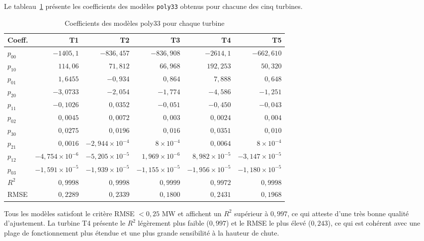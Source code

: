 \documentclass[12pt, letterpaper]{report}
\begin{document}
Le tableau~\ref{tab:coefficients} présente les coefficients des modèles \texttt{poly33} obtenus pour chacune des cinq turbines.

\begin{table}[H]
  \centering
  \caption{Coefficients des modèles poly33 pour chaque turbine}
  \label{tab:coefficients}
  \begin{tabular}{lrrrrr}
    \toprule
    Coeff. & T1 & T2 & T3 & T4 & T5 \\
    \midrule
    $p_{00}$ & $-1405{,}1$ & $-836{,}457$ & $-836{,}908$ & $-2614{,}1$ & $-662{,}610$ \\
    $p_{10}$ & $114{,}06$ & $71{,}812$ & $66{,}968$ & $192{,}253$ & $50{,}320$ \\
    $p_{01}$ & $1{,}6455$ & $-0{,}934$ & $0{,}864$ & $7{,}888$ & $0{,}648$ \\
    $p_{20}$ & $-3{,}0733$ & $-2{,}054$ & $-1{,}774$ & $-4{,}586$ & $-1{,}251$ \\
    $p_{11}$ & $-0{,}1026$ & $0{,}0352$ & $-0{,}051$ & $-0{,}450$ & $-0{,}043$ \\
    $p_{02}$ & $0{,}0045$ & $0{,}0072$ & $0{,}003$ & $0{,}0024$ & $0{,}004$ \\
    $p_{30}$ & $0{,}0275$ & $0{,}0196$ & $0{,}016$ & $0{,}0351$ & $0{,}010$ \\
    $p_{21}$ & $0{,}0016$ & $-2{,}944\!\times\!10^{-4}$ & $8\!\times\!10^{-4}$ & $0{,}0064$ & $8\!\times\!10^{-4}$ \\
    $p_{12}$ & $-4{,}754\!\times\!10^{-6}$ & $-5{,}205\!\times\!10^{-5}$ & $1{,}969\!\times\!10^{-6}$ & $8{,}982\!\times\!10^{-5}$ & $-3{,}147\!\times\!10^{-5}$ \\
    $p_{03}$ & $-1{,}591\!\times\!10^{-5}$ & $-1{,}939\!\times\!10^{-5}$ & $-1{,}155\!\times\!10^{-5}$ & $-1{,}956\!\times\!10^{-5}$ & $-1{,}180\!\times\!10^{-5}$ \\
    \midrule
    $R^2$    & $0{,}9998$ & $0{,}9998$ & $0{,}9999$ & $0{,}9972$ & $0{,}9998$ \\
    RMSE     & $0{,}2289$ & $0{,}2339$ & $0{,}1800$ & $0{,}2431$ & $0{,}1968$ \\
    \bottomrule
  \end{tabular}
\end{table}

Tous les modèles satisfont le critère RMSE $< 0{,}25$ MW et affichent un $R^2$ supérieur à $0{,}997$, ce qui atteste d'une très bonne qualité d'ajustement. La turbine T4 présente le $R^2$ légèrement plus faible ($0{,}997$) et le RMSE le plus élevé ($0{,}243$), ce qui est cohérent avec une plage de fonctionnement plus étendue et une plus grande sensibilité à la hauteur de chute.
\end{document}
